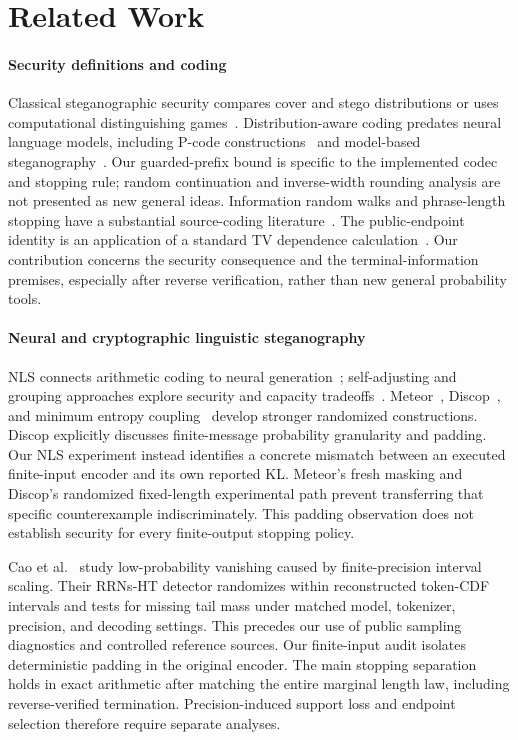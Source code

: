 \section{Related Work}
\label{sec:related-positioning}

\paragraph{Security definitions and coding}
Classical steganographic security compares cover and stego distributions or
uses computational distinguishing games~\cite{cachin1998information,hopper2002provably}.
Distribution-aware coding predates neural language models, including P-code
constructions~\cite{le2003pcodes} and model-based
steganography~\cite{sallee2004model,cox2005information}. Our guarded-prefix bound
is specific to the implemented codec and stopping rule; random continuation
and inverse-width rounding analysis are not presented as new general ideas.
Information random walks and phrase-length stopping have a substantial
source-coding literature~\cite{drmota2010tunstall,kontoyiannis2014lossless}.
The public-endpoint identity is an application of a standard TV dependence
calculation~\cite{perrone2024entropy}. Our contribution concerns the security
consequence and the terminal-information premises, especially after reverse
verification, rather than new general probability tools.

\paragraph{Neural and cryptographic linguistic steganography}
NLS connects arithmetic coding to neural generation~\cite{ziegler2019neural};
self-adjusting and grouping approaches explore security and capacity
tradeoffs~\cite{dai2019towards,shen2020near,zhang2021provably}.
Meteor~\cite{kaptchuk2021language}, Discop~\cite{ding2023discop}, and minimum
entropy coupling~\cite{dewitt2024perfect} develop stronger randomized
constructions. Discop explicitly discusses finite-message probability
granularity and padding. Our NLS experiment instead identifies a concrete
mismatch between an executed finite-input encoder and its own reported KL.
Meteor's fresh masking and Discop's randomized fixed-length experimental path
prevent transferring that specific counterexample indiscriminately.
This padding observation does not establish security for every finite-output
stopping policy.

Cao et al.~\cite{cao2026lpv} study low-probability vanishing caused by
finite-precision interval scaling. Their RRNs-HT detector randomizes within
reconstructed token-CDF intervals and tests for missing tail mass under
matched model, tokenizer, precision, and decoding settings. This precedes
our use of public sampling diagnostics and controlled reference sources.
Our finite-input audit isolates deterministic padding in the original
encoder. The main stopping separation holds in exact arithmetic after
matching the entire marginal length law, including reverse-verified
termination. Precision-induced support loss and endpoint selection therefore
require separate analyses.

